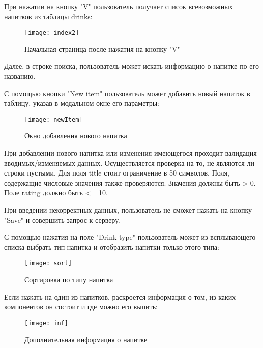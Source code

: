 При нажатии на кнопку "V" пользователь получает список всевозможных напитков из таблицы drinks:

\begin{figure}[H]
	\begin{center}
		\texttt{[image: index2]}
		\caption{Начальная страница после нажатия на кнопку "V"} 
		\label{pic:2} %
	\end{center}
\end{figure}

Далее, в строке поиска, пользователь может искать информацию о напитке по его названию.

С помощью кнопки "New item" пользователь может добавить новый напиток в таблицу, указав в модальном окне его параметры:

\begin{figure}[H]
	\begin{center}
		\texttt{[image: newItem]}
		\caption{Окно добавления нового напитка} 
		\label{pic:3} %
	\end{center}
\end{figure}

При добавлении нового напитка или изменения имеющегося проходит валидация вводимых/изменяемых данных.
Осуществляется проверка на то, не являются ли строки пустыми. Для поля title стоит ограничение в 50 символов. Поля, содержащие числовые значения также проверяются. Значения должны быть > 0. Поле rating должно быть <= 10.

При введении некорректных данных, пользователь не сможет нажать на кнопку "Save" и совершить запрос к серверу.

С помощью нажатия на поле "Drink type" пользователь может из всплывающего списка выбрать тип напитка и отобразить напитки только этого типа:

\begin{figure}[H]
	\begin{center}
		\texttt{[image: sort]}
		\caption{Сортировка по типу напитка} 
		\label{pic:4} %
	\end{center}
\end{figure}

Если нажать на один из напитков, раскроется информация о том, из каких компонентов он состоит и где можно его выпить:

\begin{figure}[H]
	\begin{center}
		\texttt{[image: inf]}
		\caption{Дополнительная информация о напитке} 
		\label{pic:5} %
	\end{center}
\end{figure}

